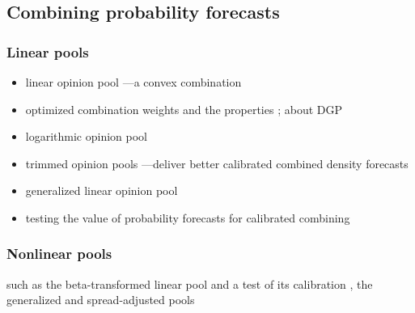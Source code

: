 \documentclass[11pt]{article}
\begin{document}
\subsection{Combining probability forecasts}
\label{sec:combining_probability_forecasts}



\subsubsection{Linear pools}
\label{sec:linear_pools}
\begin{itemize}
  \item linear opinion pool \citep{Genest1990-sr}---a convex combination %
  \item optimized combination weights and the properties \citep{Hall2007-lh}; about DGP \citep{Clements2011-ui}
  \item logarithmic opinion pool \citep{Genest1986-zl}
  \item trimmed opinion pools \citep{Jose2014-uh}---deliver better calibrated combined density forecasts
  \item generalized linear opinion pool
  \item testing the value of probability forecasts for
  calibrated combining \citep{Lahiri2015-qq}
\end{itemize}

\subsubsection{Nonlinear pools}
\label{sec:nonlinear_pools}

such as the beta-transformed linear pool \citep{Ranjan2010-jl} and a test of its calibration \citep{Lahiri2015-qq}, the generalized and spread-adjusted pools \citep{Gneiting2013-hl}
\end{document}
